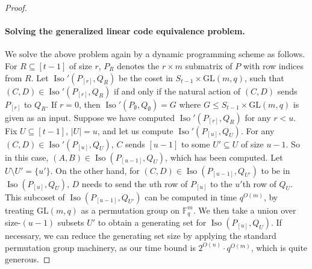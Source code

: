 \begin{proof}
\paragraph{Solving the generalized linear code equivalence problem.} We solve the above problem again by a dynamic programming scheme as follows. For $R\subseteq[t-1]$ of size $r$, $P_R$ denotes the $r\times m$ submatrix of $P$ with row indices from $R$. Let $\operatorname{Iso}'(P_{[r]},Q_R)$ be the coset in $S_{t-1}\times\mathrm{GL}(m,q)$, such that $(C,D)\in\operatorname{Iso}'(P_{[r]},Q_R)$ if and only if the natural action of $(C,D)$ sends $P_{[r]}$ to $Q_R$. If $r=0$, then $\operatorname{Iso}'(P_\emptyset,Q_\emptyset)=G$ where $G\le S_{t-1}\times\mathrm{GL}(m,q)$ is given as an input.
Suppose we have computed $\operatorname{Iso}'(P_{[r]},Q_R)$ for any $r<u$. Fix $U\subseteq[t-1]$, $|U|=u$, and let us compute $\operatorname{Iso}'(P_{[u]},Q_U)$. For any $(C,D)\in\operatorname{Iso}'(P_{[u]},Q_U)$, $C$ sends $[u-1]$ to some $U'\subseteq U$ of size $u-1$. So in this case, $(A,B)\in\operatorname{Iso}(P_{[u-1]},Q_U)$, which has been computed. Let $U\setminus U'=\{u'\}$. On the other hand, for $(C,D)\in\operatorname{Iso}(P_{[u-1]},Q_{U'})$ to be in $\operatorname{Iso}(P_{[u]},Q_U)$, $D$ needs to send the $u$th row of $P_{[u]}$ to the $u'$th row of $Q_U$. This subcoset of $\operatorname{Iso}(P_{[u-1]},Q_{U'})$ can be computed in time $q^{O(m)}$, by treating $\mathrm{GL}(m,q)$ as a permutation group on $\mathbb F_q^m$. We then take a union over size-$(u-1)$ subsets $U'$ to obtain a generating set for $\operatorname{Iso}(P_{[u]},Q_U)$. If necessary, we can reduce the generating set size by applying the standard permutation group machinery, as our time bound is $2^{O(n)}\cdot q^{O(m)}$, which is quite generous.
\end{proof}
